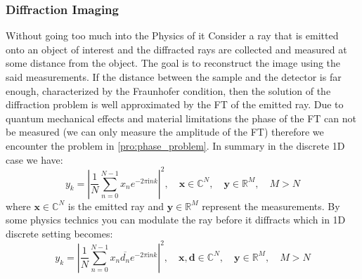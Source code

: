 \subsubsection{Diffraction Imaging}\label{sec:diffraction_imaging}

Without going too much into the Physics of it Consider a ray that is emitted onto an object of interest and the diffracted rays are collected and 
measured at some distance from the object. The goal is to reconstruct the image using the said measurements. If the distance between 
the sample and the detector is far enough, characterized by the Fraunhofer condition\cite{Lipson1995}, then the solution of the diffraction 
problem is well approximated by the \ac{FT} of the emitted ray. Due to quantum mechanical effects\cite{DGDS2018}\cite{FranzSchwabl2007} and material limitations\cite{Shechtman2015} 
the phase of the \ac{FT} can not be measured (we can only measure the amplitude of the \ac{FT}) therefore we encounter the \pp problem in \cref{pro:phase_problem}. 
In summary in the discrete 1D case we have:
\begin{equation}
	y_k = \left| \frac{1}{N}\sum_{n=0}^{N-1} x_n e^{-2\pi\mathrm{i}nk} \right|^2 , \quad \boldsymbol{x} \in \mathbb{C}^N , \quad \boldsymbol{y} \in \mathbb{R}^M, \quad M > N 
\end{equation}
where $\boldsymbol{x} \in \mathbb{C}^N$ is the emitted ray and $\boldsymbol{y} \in \mathbb{R}^M$ represent the measurements. By some physics technics\cite{Loewen2018}\cite{Candes2011} you can modulate 
the ray before it diffracts which in 1D discrete setting becomes:
\begin{equation}\label{eq:modulation_effect}
	y_k = \left| \frac{1}{N}\sum_{n=0}^{N-1} x_n\overline{d_n} e^{-2\pi\mathrm{i}nk} \right|^2 , \quad \boldsymbol{x}, \boldsymbol{d} \in \mathbb{C}^N , \quad \boldsymbol{y} \in \mathbb{R}^M, \quad M > N 
\end{equation}


